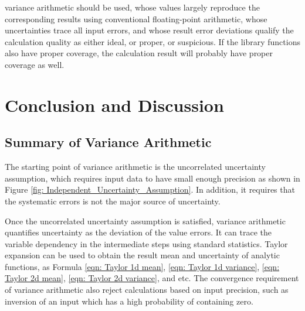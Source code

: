 \documentclass[twoside]{article}
\numberwithin{equation}{section}
\begin{document}
variance arithmetic should be used, whose values largely reproduce the corresponding results using conventional floating-point arithmetic, whose uncertainties trace all input errors, and whose result error deviations qualify the calculation quality as either ideal, or proper, or suspicious.
If the library functions also have proper coverage, the calculation result will probably have proper coverage as well.











\clearpage
\section{Conclusion and Discussion}
\label{sec: conclusion and discussion}

\subsection{Summary of Variance Arithmetic}

The starting point of variance arithmetic is the uncorrelated uncertainty assumption, which requires input data to have small enough precision as shown in Figure \ref{fig: Independent_Uncertainty_Assumption}.  In addition, it requires that the systematic errors is not the major source of uncertainty.

Once the uncorrelated uncertainty assumption is satisfied, variance arithmetic quantifies uncertainty as the deviation of the value errors.
It can trace the variable dependency in the intermediate steps using standard statistics.
Taylor expansion can be used to obtain the result mean and uncertainty of analytic functions, as Formula \eqref{eqn: Taylor 1d mean}, \eqref{eqn: Taylor 1d variance}, \eqref{eqn: Taylor 2d mean}, \eqref{eqn: Taylor 2d variance}, and etc.
The convergence requirement of variance arithmetic also reject calculations based on input precision, such as inversion of an input which has a high probability of containing zero. 
\end{document}
